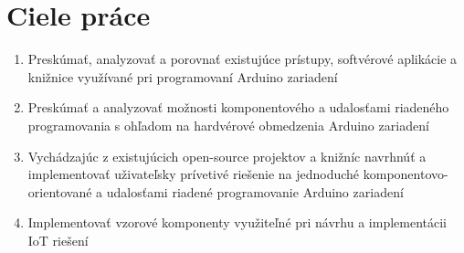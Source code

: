 \chapter{Ciele práce}

\begin{enumerate}
\item Preskúmať, analyzovať a porovnať existujúce prístupy, softvérové aplikácie a knižnice využívané pri programovaní Arduino zariadení
\item Preskúmať a analyzovať možnosti komponentového a udalosťami riadeného programovania s ohľadom na hardvérové obmedzenia Arduino zariadení
\item Vychádzajúc z existujúcich open-source projektov a knižníc navrhnúť a implementovať uživateľsky prívetivé riešenie na jednoduché komponentovo-orientované a udalosťami riadené programovanie Arduino zariadení
\item Implementovať vzorové komponenty využiteľné pri návrhu a implementácii IoT riešení
\end{enumerate}
